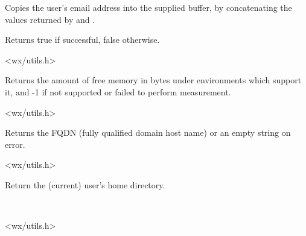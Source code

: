 \label{wxgetemailaddress}



Copies the user's email address into the supplied buffer, by
concatenating the values returned by \rtfsp
and .

Returns true if successful, false otherwise.


<wx/utils.h>


\label{wxgetfreememory}


Returns the amount of free memory in bytes under environments which
support it, and -1 if not supported or failed to perform measurement.


<wx/utils.h>


\label{wxgetfullhostname}


Returns the FQDN (fully qualified domain host name) or an empty string on
error.




<wx/utils.h>


\label{wxgethomedir}


Return the (current) user's home directory.


\\


<wx/utils.h>


\label{wxgethostname}



